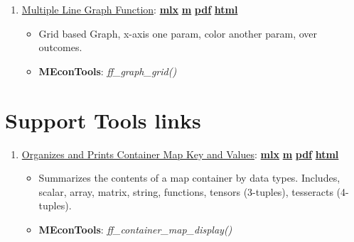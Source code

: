 \documentclass[
]{book}
\providecommand{\tightlist}{%
  \setlength{\itemsep}{0pt}\setlength{\parskip}{0pt}}
\begin{document}
\begin{enumerate}
\def\labelenumi{\arabic{enumi}.}
\tightlist
\item
  \href{https://fanwangecon.github.io/MEconTools/MEconTools/doc/graph/htmlpdfm/fx_graph_grid.html}{Multiple Line Graph Function}: \href{https://github.com/FanWangEcon/MEconTools/blob/master/MEconTools/doc/graph/fx_graph_grid.mlx}{\textbf{mlx}} \textbar{} \href{https://github.com/FanWangEcon/MEconTools/blob/master/MEconTools/doc/graph/htmlpdfm/fx_graph_grid.m}{\textbf{m}} \textbar{} \href{https://github.com/FanWangEcon/MEconTools/blob/master/MEconTools/doc/graph/htmlpdfm/fx_graph_grid.pdf}{\textbf{pdf}} \textbar{} \href{https://fanwangecon.github.io/MEconTools/MEconTools/doc/graph/htmlpdfm/fx_graph_grid.html}{\textbf{html}}

  \begin{itemize}
  \tightlist
  \item
    Grid based Graph, x-axis one param, color another param, over outcomes.
  \item
    \textbf{MEconTools}: \emph{ff\_graph\_grid()}
  \end{itemize}
\end{enumerate}

\hypertarget{support-tools-links}{%
\section{Support Tools links}\label{support-tools-links}}

\begin{enumerate}
\def\labelenumi{\arabic{enumi}.}
\tightlist
\item
  \href{https://fanwangecon.github.io/MEconTools/MEconTools/doc/tools/htmlpdfm/fx_container_map_display.html}{Organizes and Prints Container Map Key and Values}: \href{https://github.com/FanWangEcon/MEconTools/blob/master/MEconTools/doc/tools/fx_container_map_display.mlx}{\textbf{mlx}} \textbar{} \href{https://github.com/FanWangEcon/MEconTools/blob/master/MEconTools/doc/tools/htmlpdfm/fx_container_map_display.m}{\textbf{m}} \textbar{} \href{https://github.com/FanWangEcon/MEconTools/blob/master/MEconTools/doc/tools/htmlpdfm/fx_container_map_display.pdf}{\textbf{pdf}} \textbar{} \href{https://fanwangecon.github.io/MEconTools/MEconTools/doc/tools/htmlpdfm/fx_container_map_display.html}{\textbf{html}}

  \begin{itemize}
  \tightlist
  \item
    Summarizes the contents of a map container by data types. Includes, scalar, array, matrix, string, functions, tensors (3-tuples), tesseracts (4-tuples).
  \item
    \textbf{MEconTools}: \emph{ff\_container\_map\_display()}
  \end{itemize}
\end{enumerate}
\end{document}
